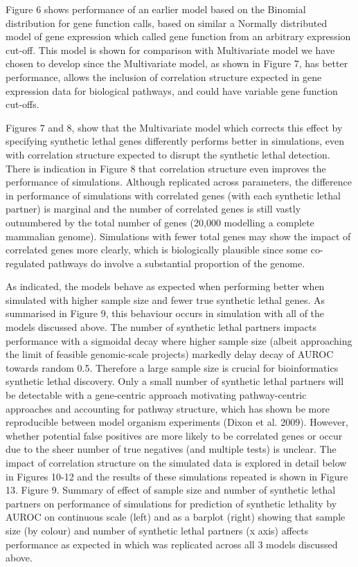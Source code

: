 Figure 6 shows performance of an earlier model based on the Binomial distribution for gene function calls, based on similar a Normally distributed model of gene expression which called gene function from an arbitrary expression cut-off.  This model is shown for comparison with Multivariate model we have chosen to develop since the Multivariate model, as shown in Figure 7, has better performance, allows the inclusion of correlation structure expected in gene expression data for biological pathways, and could have variable gene function cut-offs.  

Figures 7 and 8, show that the Multivariate model which corrects this effect by specifying synthetic lethal genes differently performs better in simulations, even with correlation structure expected to disrupt the synthetic lethal detection.  There is indication in Figure 8 that correlation structure even improves the performance of simulations.  Although replicated across parameters, the difference in performance of simulations with correlated genes (with each synthetic lethal partner) is marginal and the number of correlated genes is still vastly outnumbered by the total number of genes (20,000 modelling a complete mammalian genome).  Simulations with fewer total genes may show the impact of correlated genes more clearly, which is biologically plausible since some co-regulated pathways do involve a substantial proportion of the genome.

As indicated, the models behave as expected when performing better when simulated with higher sample size and fewer true synthetic lethal genes.  As summarised in Figure 9, this behaviour occurs in simulation with all of the models discussed above.  The number of synthetic lethal partners impacts performance with a sigmoidal decay where­­ higher sample size (albeit approaching the limit of feasible genomic-scale projects) markedly delay decay of AUROC towards random 0.5.  Therefore a large sample size is crucial for bioinformatics synthetic lethal discovery.  Only a small number of synthetic lethal partners will be detectable with a gene-centric approach motivating pathway-centric approaches and accounting for pathway structure, which has shown be more reproducible between model organism experiments (Dixon et al. 2009).  However, whether potential false positives are more likely to be correlated genes or occur due to the sheer number of true negatives (and multiple tests) is unclear.  The impact of correlation structure on the simulated data is explored in detail below in Figures 10-12 and the results of these simulations repeated is shown in Figure 13.    Figure 9.  Summary of effect of sample size and number of synthetic lethal partners on performance of simulations for prediction of synthetic lethality by AUROC on continuous scale (left) and as a barplot (right) showing that sample size (by colour) and number of synthetic lethal partners (x axis) affects performance as expected in which was replicated across all 3 models discussed above.

